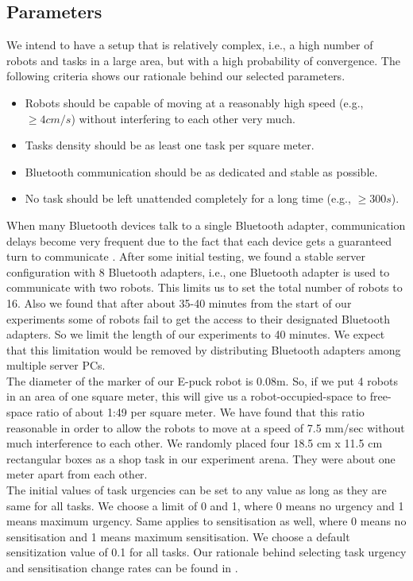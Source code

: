 \documentclass[letterpaper, 10 pt, conference]{ieeeconf}  %
\begin{document}
\subsection{Parameters}
We intend to have a setup that is relatively complex, i.e., a high number of robots and tasks in a large area, but with a high probability of convergence. The following criteria  shows our rationale behind our selected parameters.
%
\begin{itemize}
\item Robots should be capable of moving at a reasonably high speed (e.g., $\geq 4 cm/s$) without  interfering to each other very much.
\item Tasks density should be as least one task per square meter.
\item Bluetooth communication should be as dedicated and stable as possible.
\item No task should be left unattended completely for a long time (e.g., $\geq 300s $).
\end{itemize}
%
When many Bluetooth devices talk to a single Bluetooth adapter, communication delays become very frequent due to the fact that each device gets a guaranteed turn to communicate \cite{Bluetooth}. After some initial testing, we found a stable server configuration with 8 Bluetooth adapters, i.e., one Bluetooth adapter is used to communicate with two robots. This limits us to set the total number of robots to 16. Also we found that after about 35-40 minutes from the start of our experiments some of robots fail to get the access to their designated Bluetooth adapters. So we limit the length of our experiments to 40 minutes. We expect that this limitation would be removed by distributing Bluetooth adapters among multiple server PCs.\\ 
 The diameter of the marker of our E-puck robot is 0.08m. So, if we put 4 robots in an area of one square meter, this will give us a robot-occupied-space to free-space ratio of about 1:49 per square meter. We have found that this ratio reasonable in order to allow the robots to move at a speed of 7.5 mm/sec without much interference to each other. We randomly placed four 18.5 cm x 11.5 cm  rectangular boxes as a shop task in our experiment arena. They were about one meter apart from each other.\\
The initial values of task urgencies can be set to any value as long as they are same for all tasks. We choose a limit of 0 and 1, where 0 means no urgency and 1 means maximum urgency. Same applies to sensitisation as well, where 0 means no sensitisation and 1 means maximum sensitisation.  We choose a default sensitization value of 0.1 for all tasks. Our rationale behind selecting task urgency and sensitisation change rates can be found in \cite{Sarker}.
\end{document}
